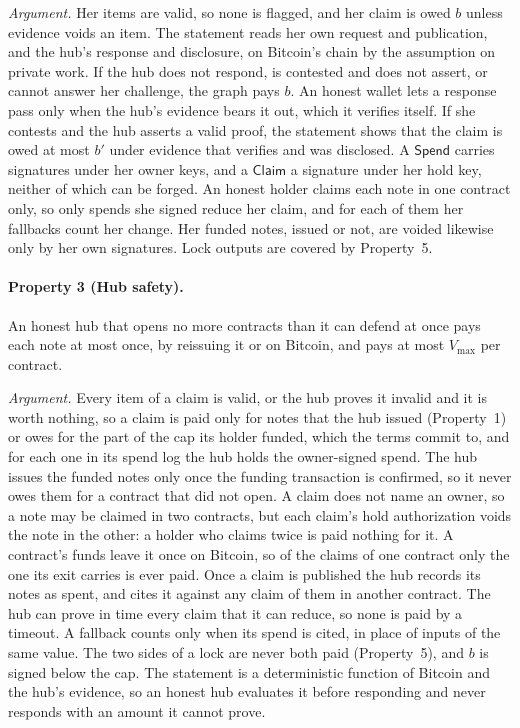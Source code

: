 \documentclass[11pt]{article}
\newcommand{\vmax}{V_{\max}}
\newcommand{\bresp}{b'}
\newcommand{\prop}[2]{\paragraph{Property #1 (#2).}}
\begin{document}
\emph{Argument.} Her items are valid, so none is flagged, and her claim is owed $b$ unless evidence voids an item. The statement reads her own request and publication, and the hub's response and disclosure, on Bitcoin's chain by the assumption on private work. If the hub does not respond, is contested and does not assert, or cannot answer her challenge, the graph pays $b$. An honest wallet lets a response pass only when the hub's evidence bears it out, which it verifies itself. If she contests and the hub asserts a valid proof, the statement shows that the claim is owed at most $\bresp$ under evidence that verifies and was disclosed. A $\mathsf{Spend}$ carries signatures under her owner keys, and a $\mathsf{Claim}$ a signature under her hold key, neither of which can be forged. An honest holder claims each note in one contract only, so only spends she signed reduce her claim, and for each of them her fallbacks count her change. Her funded notes, issued or not, are voided likewise only by her own signatures. Lock outputs are covered by Property~5.

\prop{3}{Hub safety} An honest hub that opens no more contracts than it can defend at once pays each note at most once, by reissuing it or on Bitcoin, and pays at most $\vmax$ per contract.

\emph{Argument.} Every item of a claim is valid, or the hub proves it invalid and it is worth nothing, so a claim is paid only for notes that the hub issued (Property~1) or owes for the part of the cap its holder funded, which the terms commit to, and for each one in its spend log the hub holds the owner-signed spend. The hub issues the funded notes only once the funding transaction is confirmed, so it never owes them for a contract that did not open. A claim does not name an owner, so a note may be claimed in two contracts, but each claim's hold authorization voids the note in the other: a holder who claims twice is paid nothing for it. A contract's funds leave it once on Bitcoin, so of the claims of one contract only the one its exit carries is ever paid. Once a claim is published the hub records its notes as spent, and cites it against any claim of them in another contract. The hub can prove in time every claim that it can reduce, so none is paid by a timeout. A fallback counts only when its spend is cited, in place of inputs of the same value. The two sides of a lock are never both paid (Property~5), and $b$ is signed below the cap. The statement is a deterministic function of Bitcoin and the hub's evidence, so an honest hub evaluates it before responding and never responds with an amount it cannot prove.
\end{document}
